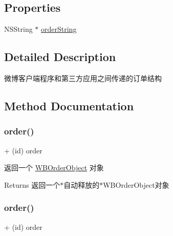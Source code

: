 \subsection*{Properties}
\begin{DoxyCompactItemize}
\item 
N\+S\+String $\ast$ \mbox{\hyperlink{interface_w_b_order_object_a6ad6af90d66f95f1265c1f1f614fa5c9}{order\+String}}
\end{DoxyCompactItemize}


\subsection{Detailed Description}
微博客户端程序和第三方应用之间传递的订单结构 

\subsection{Method Documentation}
\mbox{\label{interface_w_b_order_object_a6a258f7fa5542702bfd47a7ae5da1078}} 
\subsubsection{\texorpdfstring{order()}{order()}\hspace{0.1cm}{\footnotesize\ttfamily [1/3]}}
{\footnotesize\ttfamily + (id) order \begin{DoxyParamCaption}{ }\end{DoxyParamCaption}}

返回一个 \mbox{\hyperlink{interface_w_b_order_object}{W\+B\+Order\+Object}} 对象

\begin{DoxyReturn}{Returns}
返回一个$\ast$自动释放的$\ast$\+W\+B\+Order\+Object对象 
\end{DoxyReturn}
\mbox{\label{interface_w_b_order_object_a6a258f7fa5542702bfd47a7ae5da1078}} 
\subsubsection{\texorpdfstring{order()}{order()}\hspace{0.1cm}{\footnotesize\ttfamily [2/3]}}
{\footnotesize\ttfamily + (id) order \begin{DoxyParamCaption}{ }\end{DoxyParamCaption}}

